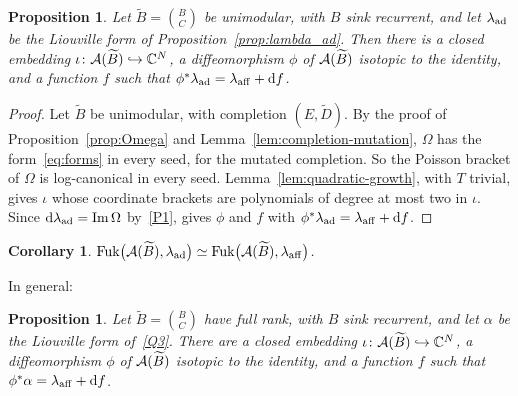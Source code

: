 \documentclass[12pt, letter]{amsart}
\DeclareMathOperator{\Fuk}{Fuk}
\newtheorem{corollary}[dummy]{Corollary}
\newtheorem{proposition}[dummy]{Proposition}
\theoremstyle{definition}
\begin{document}
\begin{proposition}\label{prop:affine unimodular case} 
Let $\widetilde B=\binom BC$ be unimodular, with $B$ sink recurrent, and let $\lambda_{\mathrm{ad}}$ be the Liouville form of Proposition~\ref{prop:lambda_ad}.
Then there is a closed embedding $\iota\colon\mathcal{A}(\widetilde B)\hookrightarrow\mathbb{C}^N$, a diffeomorphism $\phi$ of $\mathcal{A}(\widetilde B)$ isotopic to the identity, and a function $f$ such that
$\phi^*\lambda_{\mathrm{ad}}=\lambda_{\mathrm{aff}}+\mathrm{d} f
$.
\end{proposition}
\begin{proof}
Let $\widetilde B$ be unimodular, with completion $(E,\widetilde D)$.
By the proof of Proposition~\ref{prop:Omega} and Lemma~\ref{lem:completion-mutation}, $\Omega$ has the form~\eqref{eq:forms} in every seed, for the mutated completion.
So the Poisson bracket of $\Omega$ is log-canonical in every seed.
Lemma~\ref{lem:quadratic-growth}, with $T$ trivial, gives $\iota$ whose coordinate brackets are polynomials of degree at most two in $\iota$.
Since $\mathrm{d}\lambda_{\mathrm{ad}}=\operatorname{Im}\Omega$ by~\ref{P1}, \cite[Corollary~1.6]{HS26} gives $\phi$ and $f$ with $\phi^*\lambda_{\mathrm{ad}}=\lambda_{\mathrm{aff}}+\mathrm{d} f$.
\end{proof}
\begin{corollary}
$\Fuk\bigl(\cA(\widetilde B),\lad\bigr)\simeq\Fuk\bigl(\cA(\widetilde B),\laff\bigr)$.
\end{corollary}




In general:


\begin{proposition}\label{prop:affine} 
Let $\widetilde B=\binom BC$ have full rank, with $B$ sink recurrent, and let $\alpha$ be the Liouville form of~\ref{Q3}.
There are a closed embedding $\iota\colon\mathcal{A}(\widetilde B)\hookrightarrow\mathbb{C}^N$, a diffeomorphism $\phi$ of $\mathcal{A}(\widetilde B)$ isotopic to the identity, and a function $f$ such that
$
 \phi^*\alpha=\lambda_{\mathrm{aff}}+\mathrm{d} f
$.


\end{proposition}
\end{document}
